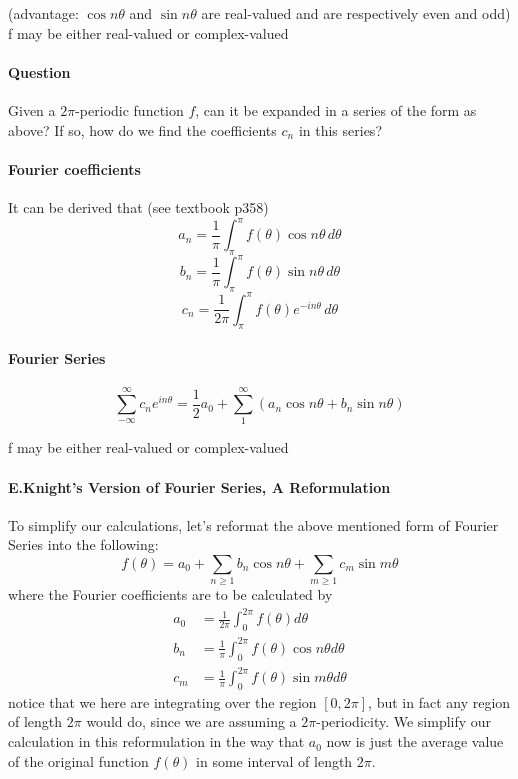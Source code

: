 \documentclass[11pt]{article}
\begin{document}
\noindent (advantage: $\cos n\theta$ and $\sin n\theta$ are real-valued and are respectively even and odd)\\
f may be either real-valued or complex-valued\\
\paragraph{Question}
Given a $2\pi$-periodic function $f$, can it be expanded in a series of the form as above? If so, how do we find the coefficients $c_n$ in this series?
\paragraph{Fourier coefficients}
It can be derived that (see textbook p358)
$$a_n = \frac{1}{\pi}\int_\pi^\pi f(\theta)\cos n\theta \, d\theta$$
$$b_n = \frac{1}{\pi}\int_\pi^\pi f(\theta)\sin n\theta \, d\theta$$
$$c_n = \frac{1}{2\pi}\int_\pi^\pi f(\theta)e^{-in\theta} \, d\theta$$
\paragraph{Fourier Series}
$$\sum_{-\infty}^{\infty} c_n e^{in\theta} = \frac{1}{2}a_0 + \sum_1^\infty(a_n\cos n\theta + b_n \sin n\theta)$$

f may be either real-valued or complex-valued

\paragraph{E.Knight's Version of Fourier Series, A Reformulation} To simplify our 
calculations, let's reformat the above mentioned form
of Fourier Series into the following:
\begin{equation*}
    f(\theta) = a_0 + \sum_{n\geq 1}b_n\cos n\theta + \sum_{m \geq 1}c_m\sin m \theta
\end{equation*}
where the Fourier coefficients are to be calculated by
\begin{align*}
    a_0 &= \frac{1}{2\pi}\int_{0}^{2\pi}f(\theta)d\theta \\
    b_n &= \frac{1}{\pi}\int_{0}^{2\pi}f(\theta)\cos n\theta d\theta \\
    c_m &= \frac{1}{\pi}\int_{0}^{2\pi}f(\theta)\sin m\theta d\theta 
\end{align*}
notice that we here are integrating over the region $[0, 2\pi]$, but in fact
any region of length $2\pi$ would do, since we are assuming a $2\pi$-periodicity.
We simplify our calculation in this reformulation in the way that $a_0$ now is
just the average value of the original function $f(\theta)$ in some interval
of length $2\pi$.
\end{document}
